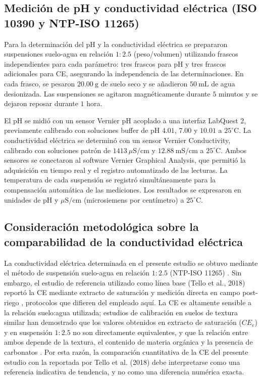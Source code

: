 \documentclass[fleqn]{jaes}
\begin{document}
\subsection{Medición de pH y conductividad eléctrica (ISO 10390 y NTP-ISO 11265)}\label{subsec:ce_metodologia_prep}

Para la determinación del pH y la conductividad eléctrica se prepararon suspensiones suelo-agua en relación $1:2.5$ (peso/volumen) utilizando frascos independientes para cada parámetro: tres frascos para pH y tres frascos adicionales para CE, asegurando la independencia de las determinaciones. En cada frasco, se pesaron $20.00~\text{g}$ de suelo seco y se añadieron $50~\text{mL}$ de agua desionizada. Las suspensiones se agitaron magnéticamente durante $5$ minutos y se dejaron reposar durante $1$ hora.

El pH se midió con un sensor Vernier pH acoplado a una interfaz LabQuest 2, previamente calibrado con soluciones buffer de pH $4.01$, $7.00$ y $10.01$ a $25^\circ\text{C}$. La conductividad eléctrica se determinó con un sensor Vernier Conductivity, calibrado con soluciones patrón de $1413~\mu\text{S/cm}$ y $12.88~\text{mS/cm}$ a $25^\circ\text{C}$. Ambos sensores se conectaron al software Vernier Graphical Analysis, que permitió la adquisición en tiempo real y el registro automatizado de las lecturas. La temperatura de cada suspensión se registró simultáneamente para la compensación automática de las mediciones. Los resultados se expresaron en unidades de pH y $\mu\text{S/cm}$ (microsiemens por centímetro) a $25^\circ\text{C}$.

\subsection{Consideración metodológica sobre la comparabilidad de la conductividad eléctrica}\label{subsec:ce_metodologia}

La conductividad eléctrica determinada en el presente estudio se obtuvo mediante el método de suspensión suelo-agua en relación $1:2.5$ (NTP-ISO 11265) \cite{INACAL2018}. Sin embargo, el estudio de referencia utilizado como línea base (Tello et al., 2018) reportó la CE mediante extracto de saturación y medición directa en campo post-riego \cite{Tello2018}, protocolos que difieren del empleado aquí. La CE es altamente sensible a la relación suelo:agua utilizada; estudios de calibración en suelos de textura similar han demostrado que los valores obtenidos en extracto de saturación ($CE_e$) y en suspensión $1:2.5$ no son directamente equivalentes, y que la relación entre ambos depende de la textura, el contenido de materia orgánica y la presencia de carbonatos \cite{Kargas2024, Chiaradia2024}. Por esta razón, la comparación cuantitativa de la CE del presente estudio con la reportada por Tello et al. (2018) debe interpretarse como una referencia indicativa de tendencia, y no como una diferencia numérica exacta.
\end{document}
